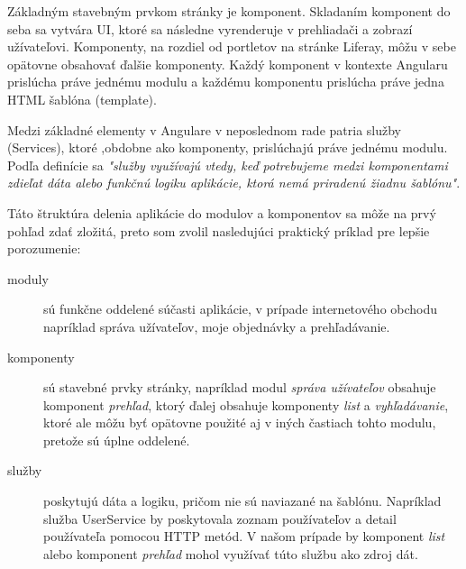 \documentclass[
  digital, %
  twoside, %
  notable,   %
  nolof,   %
  nolot,   %
]{fithesis3}
\begin{document}
Základným stavebným prvkom stránky je komponent. Skladaním komponent do seba sa vytvára UI, ktoré sa následne vyrenderuje v prehliadači a zobrazí užívateľovi. Komponenty, na rozdiel od portletov na stránke Liferay, môžu v sebe opätovne obsahovať ďalšie komponenty. Každý komponent v kontexte Angularu prislúcha práve jednému modulu a každému komponentu prislúcha práve jedna HTML šablóna (template).

Medzi základné elementy v Angulare v neposlednom rade patria služby (Services), ktoré ,obdobne ako komponenty, prislúchajú práve jednému modulu. Podľa definície sa \textit{"služby využívajú vtedy, keď potrebujeme medzi komponentami zdieľat dáta alebo funkčnú logiku aplikácie, ktorá nemá priradenú žiadnu šablónu"}\cite{angular}.

Táto štruktúra delenia aplikácie do modulov a komponentov sa môže na prvý pohľad zdať zložitá, preto som zvolil nasledujúci praktický príklad pre lepšie porozumenie:
\begin{description}
\item[moduly] sú funkčne oddelené súčasti aplikácie, v prípade internetového obchodu napríklad správa užívateľov, moje objednávky a prehľadávanie.
\item[komponenty] sú stavebné prvky stránky, napríklad modul \textit{správa užívateľov} obsahuje komponent \textit{prehľad}, ktorý ďalej obsahuje komponenty \textit{list} a \textit{vyhľadávanie}, ktoré ale môžu byť opätovne použité aj v iných častiach tohto modulu, pretože sú úplne oddelené.
\item[služby] poskytujú dáta a logiku, pričom nie sú naviazané na šablónu. Napríklad služba UserService by poskytovala zoznam používateľov a detail používateľa pomocou HTTP metód. V našom prípade by komponent \textit{list} alebo komponent \textit{prehľad} mohol využívať túto službu ako zdroj dát.
\end{description}
\end{document}
